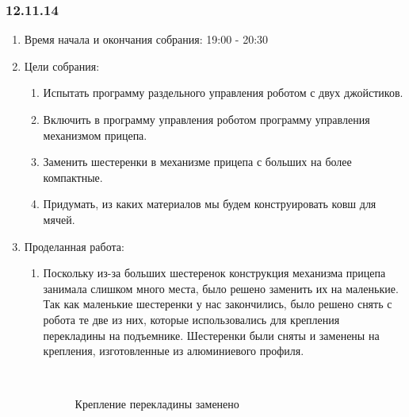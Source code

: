 
\subsubsection{12.11.14} 

\begin{enumerate} 
	\item Время начала и окончания собрания:
	19:00 - 20:30
	\item Цели собрания:
	\begin{enumerate}
		\item Испытать программу раздельного управления роботом с двух джойстиков.
		
		\item Включить в программу управления роботом программу управления механизмом прицепа.
		
		\item Заменить шестеренки в механизме прицепа с больших на более компактные.
		
		\item Придумать, из каких материалов мы будем конструировать ковш для мячей.
		
	\end{enumerate}
	
	\item Проделанная работа:
	\begin{enumerate}
		\item Поскольку из-за больших шестеренок конструкция механизма прицепа занимала слишком много места, было решено заменить их на маленькие. Так как маленькие шестеренки у нас закончились, было решено снять с робота те две из них, которые использовались для крепления перекладины на подъемнике. Шестеренки были сняты и заменены на крепления, изготовленные из алюминиевого профиля.
		
		\begin{figure}[H]
			\begin{minipage}[h]{0.2\linewidth}
				\center  
			\end{minipage}
			\begin{minipage}[h]{0.6\linewidth}
				\caption{Крепление перекладины заменено}
			\end{minipage}
		\end{figure}
		

\end{enumerate}
\end{enumerate}
